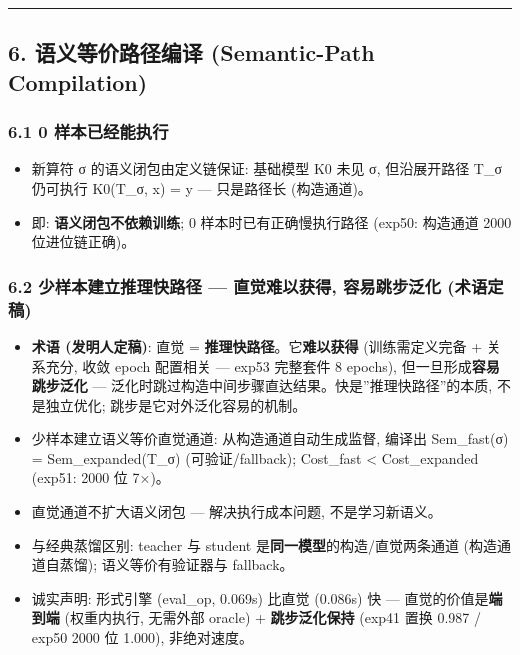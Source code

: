\documentclass[
]{article}
\providecommand{\tightlist}{%
  \setlength{\itemsep}{0pt}\setlength{\parskip}{0pt}}
\begin{document}
\begin{center}\rule{0.5\linewidth}{0.5pt}\end{center}

\subsection{6. 语义等价路径编译 (Semantic-Path
Compilation)}\label{ux8bedux4e49ux7b49ux4ef7ux8defux5f84ux7f16ux8bd1-semantic-path-compilation}

\subsubsection{6.1 0
样本已经能执行}\label{ux6837ux672cux5df2ux7ecfux80fdux6267ux884c}

\begin{itemize}
\tightlist
\item
  新算符 σ 的语义闭包由定义链保证: 基础模型 K0 未见 σ, 但沿展开路径 T\_σ
  仍可执行 K0(T\_σ, x) = y --- 只是路径长 (构造通道)。
\item
  即: \textbf{语义闭包不依赖训练}; 0 样本时已有正确慢执行路径 (exp50:
  构造通道 2000 位进位链正确)。
\end{itemize}

\subsubsection{6.2 少样本建立推理快路径 --- 直觉难以获得, 容易跳步泛化
(术语定稿)}\label{ux5c11ux6837ux672cux5efaux7acbux63a8ux7406ux5febux8defux5f84-ux76f4ux89c9ux96beux4ee5ux83b7ux5f97-ux5bb9ux6613ux8df3ux6b65ux6cdbux5316-ux672fux8bedux5b9aux7a3f}

\begin{itemize}
\tightlist
\item
  \textbf{术语 (发明人定稿)}: 直觉 =
  \textbf{推理快路径}。它\textbf{难以获得} (训练需定义完备 + 关系充分,
  收敛 epoch 配置相关 --- exp53 完整套件 8 epochs),
  但一旦形成\textbf{容易跳步泛化} ---
  泛化时跳过构造中间步骤直达结果。快是''推理快路径''的本质,
  不是独立优化; 跳步是它对外泛化容易的机制。
\item
  少样本建立语义等价直觉通道: 从构造通道自动生成监督, 编译出
  Sem\_fast(σ) = Sem\_expanded(T\_σ) (可验证/fallback); Cost\_fast
  \textless{} Cost\_expanded (exp51: 2000 位 7×)。
\item
  直觉通道不扩大语义闭包 --- 解决执行成本问题, 不是学习新语义。
\item
  与经典蒸馏区别: teacher 与 student
  是\textbf{同一模型}的构造/直觉两条通道 (构造通道自蒸馏);
  语义等价有验证器与 fallback。
\item
  诚实声明: 形式引擎 (eval\_op, 0.069s) 比直觉 (0.086s) 快 ---
  直觉的价值是\textbf{端到端} (权重内执行, 无需外部 oracle) +
  \textbf{跳步泛化保持} (exp41 置换 0.987 / exp50 2000 位 1.000),
  非绝对速度。
\end{itemize}
\end{document}

